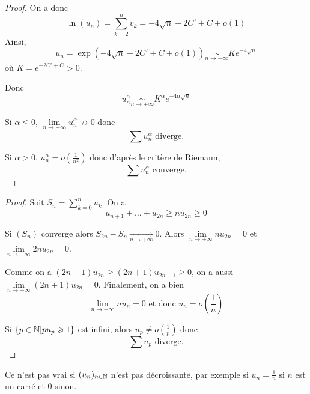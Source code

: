 \begin{proof}
	On a donc 
	$$\ln(u_{n})=\sum_{k=2}^{n}v_{k}=-4\sqrt{n}-2C'+C+o\left(1\right)$$
	Ainsi, 
	$$u_{n}=\exp\left(-4\sqrt{n}-2C'+C+o\left(1\right)\right)\underset{n\to+\infty}{\sim}Ke^{-4\sqrt{n}}$$
	où $K=e^{-2C'+C}>0$.

	Donc 
	$$u_{n}^{\alpha}\underset{n\to+\infty}{\sim}K^{\alpha}e^{-4\alpha\sqrt{n}}$$

	Si $\alpha\leqslant0$, $\lim\limits_{n\to+\infty}u_{n}^{\alpha}\not\to 0$
	donc 
	$$\boxed{\sum u_{n}^{\alpha}\text{ diverge.}}$$

	Si $\alpha>0$, $u_{n}^{\alpha}=o\left(\frac{1}{n^{2}}\right)$ donc d'après le critère de Riemann, 
	$$\boxed{\sum u_{n}^{\alpha}\text{ converge.}}$$
\end{proof}

\begin{proof}
	Soit $S_{n}=\sum_{k=0}^{n}u_{k}$. On a 
	$$u_{n+1}+\dots+u_{2n}\geqslant nu_{2n}\geqslant0$$

	Si $(S_{n})$ converge alors $S_{2n}-S_{n}\xrightarrow[n\to+\infty]{}0$. Alors $\lim\limits_{n\to+\infty}nu_{2n}=0$ et $\lim\limits_{n\to+\infty}2n u_{2n}=0$.

	Comme on a $(2n+1)u_{2n}\geqslant (2n+1)u_{2n+1}\geqslant0$, on a aussi $\lim\limits_{n\to+\infty}(2n+1) u_{2n}=0$. Finalement, on a bien 
	$$\boxed{\lim\limits_{n\to+\infty}nu_{n}=0\text{ et donc }u_{n}=o\left(\frac{1}{n}\right)}$$

	Si $\left\{p\in\mathbb{N} \middle|pu_{p}\geqslant1 \right\}$ est infini, alors $u_{p}\neq o\left(\frac{1}{p}\right)$ donc 
	$$\boxed{\sum u_{p}\text{ diverge.}}$$
\end{proof}

\begin{remark}
	Ce n'est pas vrai si $(u_{n})_{n\in\mathbb{N}}$ n'est pas décroissante, par exemple si $u_{n}=\frac{1}{n}$ si $n$ est un carré et 0 sinon.
\end{remark}

